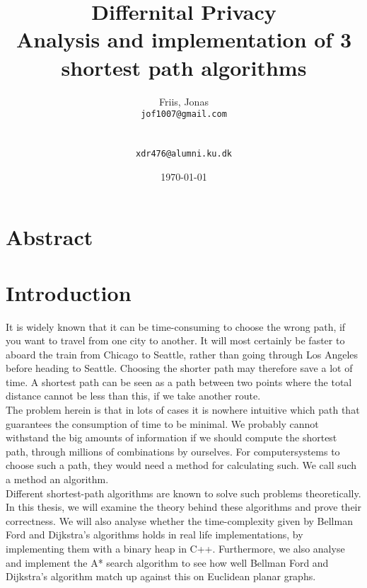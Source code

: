 \documentclass[11pt]{article}
\title{
  \vspace{3cm}
  \Huge{Differnital Privacy} \\
  \Large{Analysis and implementation of 3 shortest path algorithms}
}
\author{
  \Large{Friis, Jonas}
  \\ \texttt{jof1007@gmail.com} \\\\
  \\ \texttt{xdr476@alumni.ku.dk}
}
\date{
    \today
}
\def \ColourPDF {include/ku-farve}
\def \TitlePDF   {include/nat-en}  %
\begin{document}


\clearpage\maketitle
\thispagestyle{empty}

\newpage

\section{Abstract}


\newpage
\tableofcontents
\newpage
\section{Introduction}
It is widely known that it can be time-consuming to choose the wrong path, if you want to travel from one city to another. It will most certainly be faster to aboard the train from Chicago to Seattle, rather than going through Los Angeles before heading to Seattle. Choosing the shorter path may therefore save a lot of time. A shortest path can be seen as a path between two points where the total distance cannot be less than this, if we take another route. \\

\noindent The problem herein is that in lots of cases it is nowhere intuitive which path that guarantees the consumption of time to be minimal. We probably cannot withstand the big amounts of information if we should compute the shortest path, through millions of combinations by ourselves. For computersystems to choose such a path, they would need a method for calculating such. We call such a method an algorithm.\\

\noindent Different shortest-path algorithms are known to solve such problems theoretically. In this thesis, we will examine the theory behind these algorithms and prove their correctness. We will also analyse whether the time-complexity given by Bellman Ford and Dijkstra's algorithms holds in real life implementations, by implementing them with a binary heap in C++. Furthermore, we also analyse and implement the A* search algorithm to see how well Bellman Ford and Dijkstra's algorithm match up against this on Euclidean planar graphs.\\
\end{document}
